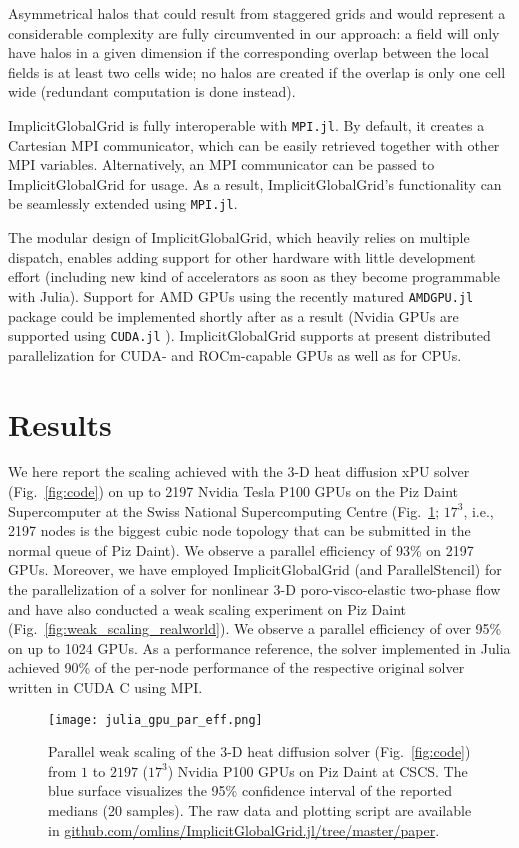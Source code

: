 \documentclass{juliacon}
\begin{document}
Asymmetrical halos that could result from staggered grids and would represent a considerable complexity are fully circumvented in our approach: a field will only have halos in a given dimension if the corresponding overlap between the local fields is at least two cells wide; no halos are created if the overlap is only one cell wide (redundant computation is done instead).

ImplicitGlobalGrid is fully interoperable with \texttt{MPI.jl}. By default, it creates a Cartesian MPI communicator, which can be easily retrieved together with other MPI variables. Alternatively, an MPI communicator can be passed to ImplicitGlobalGrid for usage. As a result, ImplicitGlobalGrid's functionality can be seamlessly extended using \texttt{MPI.jl}.

The modular design of ImplicitGlobalGrid, which heavily relies on multiple dispatch, enables adding support for other hardware with little development effort (including new kind of accelerators as soon as they become programmable with Julia). Support for AMD GPUs using the recently matured \texttt{AMDGPU.jl} package \cite{amdgpu_jl} could be implemented shortly after as a result (Nvidia GPUs are supported using \texttt{CUDA.jl} \cite{besard2018effective}). ImplicitGlobalGrid supports at present distributed parallelization for CUDA- and ROCm-capable GPUs as well as for CPUs.

\section{Results}
We here report the scaling achieved with the 3-D heat diffusion xPU solver (Fig.~\ref{fig:code}) on up to 2197 Nvidia Tesla P100 GPUs on the Piz Daint Supercomputer at the Swiss National Supercomputing Centre (Fig.~\ref{fig:weak_scaling}; $17^\mathrm{3}$, i.e., 2197 nodes is the biggest cubic node topology that can be submitted in the normal queue of Piz Daint). We observe a parallel efficiency of 93\% on 2197 GPUs.
Moreover, we have employed ImplicitGlobalGrid (and ParallelStencil) for the parallelization of a solver for nonlinear 3-D poro-visco-elastic two-phase flow and have also conducted a weak scaling experiment on Piz Daint (Fig.~\ref{fig:weak_scaling_realworld}). We observe a parallel efficiency of over 95\% on up to 1024 GPUs. As a performance reference, the solver implemented in Julia achieved 90\% of the per-node performance of the respective original solver written in CUDA C using MPI.

\begin{figure}[t]
    \centerline{\texttt{[image: julia\_gpu\_par\_eff.png]}}
    \caption{Parallel weak scaling of the 3-D heat diffusion solver (Fig.~\ref{fig:code}) from $1$ to $2197$ ($17^\mathrm{3}$) Nvidia P100 GPUs on Piz Daint at CSCS. The blue surface visualizes the 95\% confidence interval of the reported medians (20 samples). The raw data and plotting script are available in \url{github.com/omlins/ImplicitGlobalGrid.jl/tree/master/paper}.}
	\label{fig:weak_scaling}
\end{figure}
\end{document}
